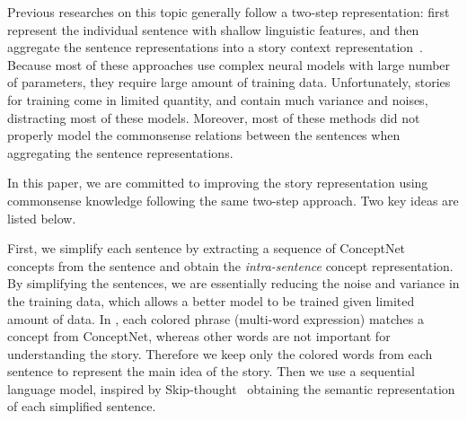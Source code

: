Previous researches on this topic generally follow a two-step representation:
first represent the individual sentence with shallow linguistic features,
and then aggregate the sentence representations into a story context
representation~\cite{mostafazadeh2016story,li2018multi,chen2018incorporating,zhou2019story}.
Because most of these approaches use complex neural models
with large number of parameters,
they require large amount of training data.
Unfortunately, stories for training come in limited quantity,
and contain much variance and noises, distracting most of these models.
Moreover, most of these methods did not properly model the
commonsense relations between the sentences when aggregating
the sentence representations.


In this paper, we are committed to improving the story representation
using commonsense knowledge following the same two-step approach.
Two key ideas are listed below.

First, we simplify each sentence by extracting a sequence of
ConceptNet~\cite{speer2017conceptnet} concepts from the sentence
and obtain the {\em intra-sentence} concept representation.
By simplifying the sentences, we are essentially reducing the noise
and variance in the training data, which allows a better model to
be trained given limited amount of data.
In , each colored phrase (multi-word expression)
matches a concept from ConceptNet,
whereas other words are not important for understanding
the story. Therefore we keep only the colored words
from each sentence to represent the main idea of the story.
Then we use a sequential language model, inspired by
Skip-thought~\cite{kiros2015skip} obtaining the
semantic representation of each simplified sentence.

